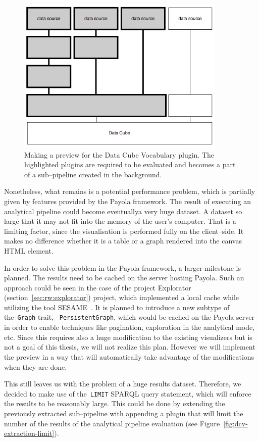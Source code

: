 \begin{figure}
	\centering
	\includegraphics[width=100mm]{img/dcv-extraction.png}
	\caption{Making a preview for the Data Cube Vocabulary plugin. The highlighted
	plugins are required to be evaluated and becomes a part of a sub--pipeline created
	in the background.}
	\label{fig:dcv-extraction}
\end{figure}

Nonetheless, what remains is a potential performance problem, which is partially given 
by features provided by the Payola framework. The result of executing an 
analytical pipeline could become eventuallya very huge dataset. A dataset so 
large that it may not fit into the memory of the user's computer. That is a 
limiting factor, since the visualisation is performed fully on the client--side. 
It makes no difference whether it is a table or a graph rendered into the canvas HTML element.

In order to solve this problem in the Payola framework, a larger milestone is 
planned. The results need to be cached on the server hosting Payola.
Such an approach could be seen in the case of the project 
Explorator (section~\ref{sec:rw:explorator}) project, which implemented a local cache
while utilizing the tool SESAME~\cite{sesame}. It is planned to introduce a new 
subtype of the~\texttt{Graph} trait, ~\texttt{PersistentGraph}, which would be 
cached on the Payola server in order to enable techniques like pagination, 
exploration in the analytical mode, etc. Since this requires also a huge 
modification to the existing visualizers but is not a goal of this thesis, we will 
not realize this plan. However we will implement the preview in a way that will 
automatically take advantage of the modifications when they are done.

This still leaves us with the problem of a huge results dataset. Therefore, we 
decided to make use of the~\texttt{LIMIT} SPARQL query statement, which will 
enforce the results to be reasonably large. This could be done by 
extending the previously extracted sub--pipeline with appending a plugin that 
will limit the number of the results of the analytical pipeline evaluation (see Figure~\ref{fig:dcv-extraction-limit}).

